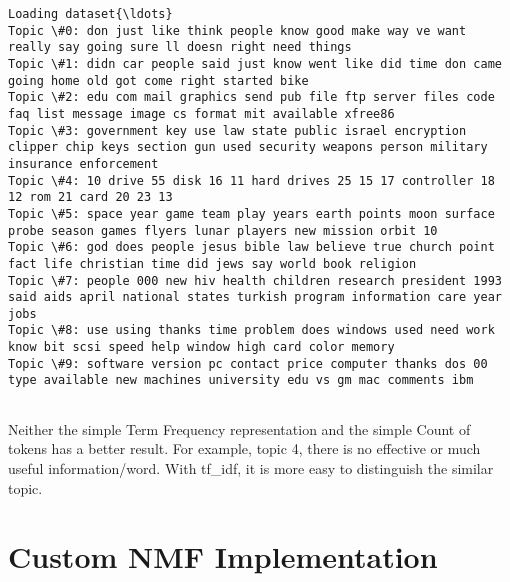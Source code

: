 \documentclass[11pt]{article}
\begin{document}
    \begin{Verbatim}[commandchars=\\\{\}]
Loading dataset{\ldots}
Topic \#0: don just like think people know good make way ve want really say going sure ll doesn right need things
Topic \#1: didn car people said just know went like did time don came going home old got come right started bike
Topic \#2: edu com mail graphics send pub file ftp server files code faq list message image cs format mit available xfree86
Topic \#3: government key use law state public israel encryption clipper chip keys section gun used security weapons person military insurance enforcement
Topic \#4: 10 drive 55 disk 16 11 hard drives 25 15 17 controller 18 12 rom 21 card 20 23 13
Topic \#5: space year game team play years earth points moon surface probe season games flyers lunar players new mission orbit 10
Topic \#6: god does people jesus bible law believe true church point fact life christian time did jews say world book religion
Topic \#7: people 000 new hiv health children research president 1993 said aids april national states turkish program information care year jobs
Topic \#8: use using thanks time problem does windows used need work know bit scsi speed help window high card color memory
Topic \#9: software version pc contact price computer thanks dos 00 type available new machines university edu vs gm mac comments ibm


    \end{Verbatim}

    Neither the simple Term Frequency representation and the simple Count of
tokens has a better result. For example, topic 4, there is no effective
or much useful information/word. With tf\_idf, it is more easy to
distinguish the similar topic.

    \section{Custom NMF Implementation}\label{custom-nmf-implementation}
\end{document}
